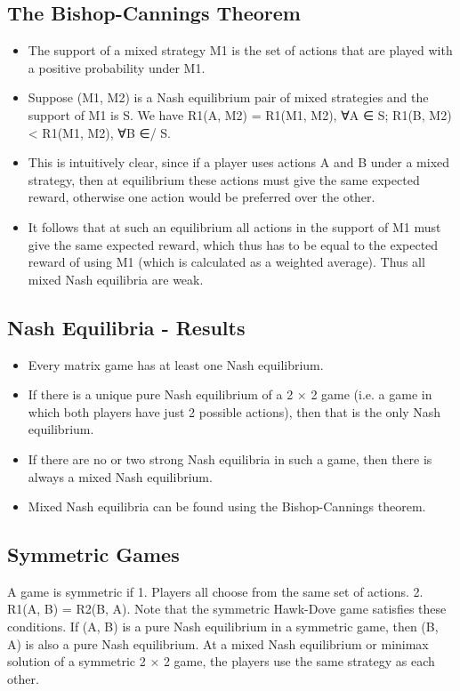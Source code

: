 \documentclass[]{report}
\begin{document}
\subsection{The Bishop-Cannings Theorem}
\begin{itemize}
	\item The support of a mixed strategy M1 is the set of actions that are
	played with a positive probability under M1.
\item Suppose (M1, M2) is a Nash equilibrium pair of mixed strategies
	and the support of M1 is S. We have
	R1(A, M2) = R1(M1, M2), ∀A ∈ S; R1(B, M2) < R1(M1, M2), ∀B ∈/ S.
\item This is intuitively clear, since if a player uses actions A and B
	under a mixed strategy, then at equilibrium these actions must give
	the same expected reward, otherwise one action would be preferred
	over the other.
\item It follows that at such an equilibrium all actions in the support of
	M1 must give the same expected reward, which thus has to be
	equal to the expected reward of using M1 (which is calculated as a
	weighted average). Thus all mixed Nash equilibria are weak.
\end{itemize}

\subsection{Nash Equilibria - Results}
\begin{itemize}
	\item Every matrix game has at least one Nash equilibrium.
\item If there is a unique pure Nash equilibrium of a 2 × 2 game (i.e. a
	game in which both players have just 2 possible actions), then that
	is the only Nash equilibrium.
\item If there are no or two strong Nash equilibria in such a game, then
	there is always a mixed Nash equilibrium.
\item Mixed Nash equilibria can be found using the Bishop-Cannings
	theorem.
\end{itemize}

\subsection{Symmetric Games}
A game is symmetric if
1. Players all choose from the same set of actions.
2. R1(A, B) = R2(B, A).
Note that the symmetric Hawk-Dove game satisfies these
conditions.
If (A, B) is a pure Nash equilibrium in a symmetric game, then
(B, A) is also a pure Nash equilibrium.
At a mixed Nash equilibrium or minimax solution of a symmetric
2 × 2 game, the players use the same strategy as each other.
\end{document}
